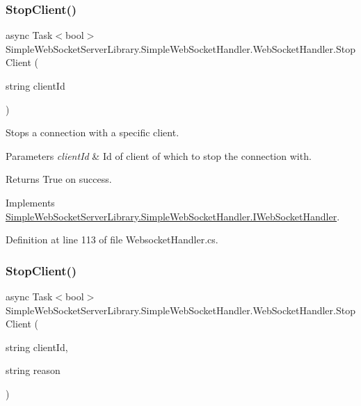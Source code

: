 \subsubsection{\texorpdfstring{Stop\+Client()}{StopClient()}\hspace{0.1cm}{\footnotesize\ttfamily [1/2]}}
{\footnotesize\ttfamily async Task$<$bool$>$ Simple\+Web\+Socket\+Server\+Library.\+Simple\+Web\+Socket\+Handler.\+Web\+Socket\+Handler.\+Stop\+Client (\begin{DoxyParamCaption}\item[{string}]{client\+Id }\end{DoxyParamCaption})}



Stops a connection with a specific client. 


\begin{DoxyParams}{Parameters}
{\em client\+Id} & Id of client of which to stop the connection with.\\
\hline
\end{DoxyParams}
\begin{DoxyReturn}{Returns}
True on success.
\end{DoxyReturn}


Implements \mbox{\hyperlink{interface_simple_web_socket_server_library_1_1_simple_web_socket_handler_1_1_i_web_socket_handler_a38b3104f285279f6fd3101765b2f0076}{Simple\+Web\+Socket\+Server\+Library.\+Simple\+Web\+Socket\+Handler.\+I\+Web\+Socket\+Handler}}.



Definition at line 113 of file Websocket\+Handler.\+cs.

\mbox{\label{class_simple_web_socket_server_library_1_1_simple_web_socket_handler_1_1_web_socket_handler_a26ca8d6d9ebbefae58bbdaf3ff7986c4}} 
\subsubsection{\texorpdfstring{Stop\+Client()}{StopClient()}\hspace{0.1cm}{\footnotesize\ttfamily [2/2]}}
{\footnotesize\ttfamily async Task$<$bool$>$ Simple\+Web\+Socket\+Server\+Library.\+Simple\+Web\+Socket\+Handler.\+Web\+Socket\+Handler.\+Stop\+Client (\begin{DoxyParamCaption}\item[{string}]{client\+Id,  }\item[{string}]{reason }\end{DoxyParamCaption})}



